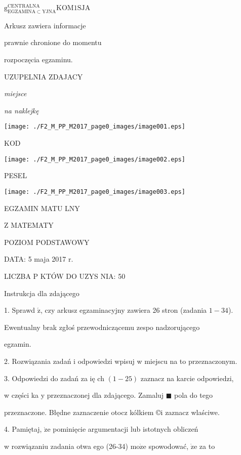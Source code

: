 \documentclass[a4paper,12pt]{article}
\begin{document}
$\mathrm{g}_{\mathrm{E}\mathrm{G}\mathrm{Z}\mathrm{A}\mathrm{M}\mathrm{I}\mathrm{N}\mathrm{A}\subset \mathrm{Y}\mathrm{J}\mathrm{N}\mathrm{A}}^{\mathrm{C}\mathrm{E}\mathrm{N}\mathrm{T}\mathrm{R}\mathrm{A}\mathrm{L}\mathrm{N}\mathrm{A}}\mathrm{K}\mathrm{O}\mathrm{M}1\mathrm{S}\mathrm{J}\mathrm{A}$

Arkusz zawiera informacje

prawnie chronione do momentu

rozpoczęcia egzaminu.

UZUPELNIA ZDAJACY

{\it miejsce}

{\it na naklejkę}
\begin{center}
\texttt{[image: ./F2\_M\_PP\_M2017\_page0\_images/image001.eps]}
\end{center}
KOD
\begin{center}
\texttt{[image: ./F2\_M\_PP\_M2017\_page0\_images/image002.eps]}
\end{center}
PESEL
\begin{center}
\texttt{[image: ./F2\_M\_PP\_M2017\_page0\_images/image003.eps]}
\end{center}
EGZAMIN MATU  LNY

Z MATEMATY

POZIOM PODSTAWOWY

DATA: 5 maja 2017 r.

LICZBA P KTÓW DO UZYS NIA: 50

Instrukcja dla zdającego

1. Sprawd $\acute{\mathrm{z}}$, czy arkusz egzaminacyjny zawiera 26 stron (zadania $1-34$).

Ewentualny brak zgłoś przewodniczącemu zespo nadzorującego

egzamin.

2. Rozwiązania zadań i odpowiedzi wpisuj w miejscu na to przeznaczonym.

3. Odpowiedzi do zadań za ię ch $(1-25)$ zaznacz na karcie odpowiedzi,

w części ka $\mathrm{y}$ przeznaczonej dla zdającego. Zamaluj $\blacksquare$ pola do tego

przeznaczone. Błędne zaznaczenie otocz kólkiem \copyright i zaznacz wlaściwe.

4. Pamiętaj, $\dot{\mathrm{z}}\mathrm{e}$ pominięcie argumentacji lub istotnych obliczeń

w rozwiązaniu zadania otwa ego (26-34) $\mathrm{m}\mathrm{o}\dot{\mathrm{z}}\mathrm{e}$ spowodować, $\dot{\mathrm{z}}\mathrm{e}$ za to
\end{document}

